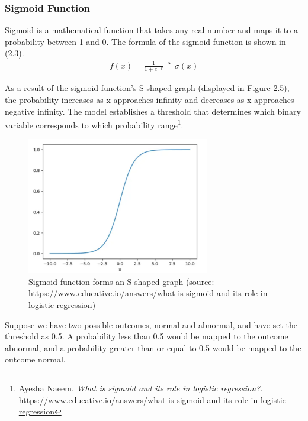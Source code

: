\subsubsection{Sigmoid Function}
\hspace{0.5cm}Sigmoid is a mathematical function that takes any real number and maps it to a probability between 1 and 0.
The formula of the sigmoid function is shown in (2.3).
\begin{align}
    f(x) = \frac{1}{1 + e^{-x}} \triangleq \sigma(x)
\end{align}

As a result of the sigmoid function's S-shaped graph (displayed in Figure 2.5), the probability increases as x approaches infinity and decreases as x approaches negative infinity. The model establishes a threshold that determines which binary variable corresponds to which probability range\footnote{
	Ayesha Naeem. \textit{What is sigmoid and its role in logistic regression?}. \url{https://www.educative.io/answers/what-is-sigmoid-and-its-role-in-logistic-regression}
}.

\begin{figure}[ht]
	\centering
	\includegraphics[width=\linewidth, height=6cm,keepaspectratio]{figures/sigmoid.PNG}
	\caption{Sigmoid function forms an S-shaped graph (source: \url{https://www.educative.io/answers/what-is-sigmoid-and-its-role-in-logistic-regression})}
\end{figure}

Suppose we have two possible outcomes, normal and abnormal, and have set the threshold as 0.5. A probability less than 0.5 would be mapped to the outcome abnormal, and a probability greater than or equal to 0.5 would be mapped to the outcome normal.


